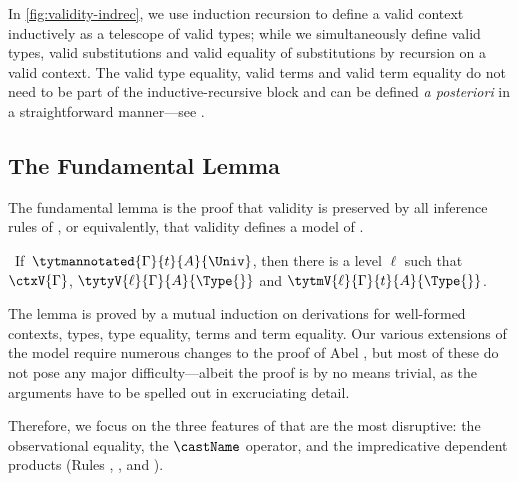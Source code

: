 \begin{figure*}
  \caption{Inductive recursive definition of validity of contexts, types and substitutions}
  \label{fig:validity-indrec}
\end{figure*}

In \cref{fig:validity-indrec}, we use induction recursion to define a 
valid context inductively as a telescope of valid types; while we 
simultaneously define valid types, valid substitutions and 
valid equality of substitutions by recursion on a valid context.
% 
The valid type equality, valid terms and valid term equality do not need to be 
part of the inductive-recursive block and can be defined \textit{a posteriori}
in a straightforward manner---see .

\subsection{The Fundamental Lemma}
\label{sec:fundamental-lemma}

The fundamental lemma is the proof that validity is preserved by all inference 
rules of \SetoidCC, or equivalently, that validity defines a model of 
\SetoidCC.

\begin{lemma}
  \label{thm:fundamental}
  \
  If\, \( \tytmannotated{\Gamma}{t}{A}{\Univ} \), then there is a level \( \ell \) such that $\ctxV{\Gamma}$,
  \( \tytyV{\ell}{\Gamma}{A}{\Type{}} \) and \( \tytmV{\ell}{\Gamma}{t}{A}{\Type{}} \).
\end{lemma}

The lemma is proved by a mutual induction on derivations for well-formed 
contexts, types, type equality, terms and term equality. 
% 
Our various extensions of the model require numerous changes to the proof of 
Abel \etal, but most of these do not pose any major difficulty---albeit the 
proof is by no means trivial, as the arguments have to be spelled out in
excruciating detail.

Therefore, we focus on the three features of \SetoidCC that are the most
disruptive: the observational equality, the \( \castName \) operator, and
the impredicative dependent products 
(Rules , , and ).

